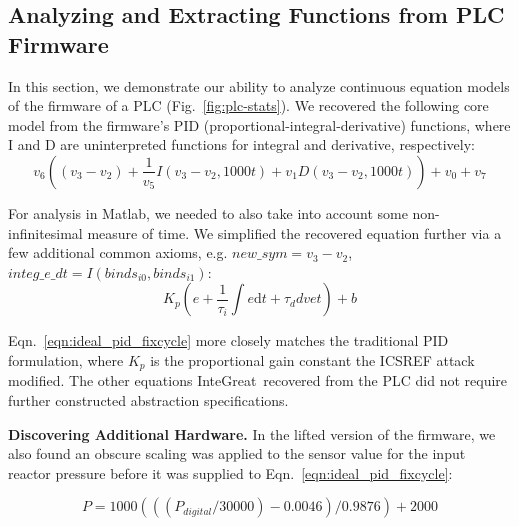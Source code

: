 \subsection{Analyzing and Extracting Functions from PLC Firmware}
\label{sec:plc}

In this section, we demonstrate our ability to analyze continuous equation models of the firmware of a PLC (Fig.~\ref{fig:plc-stats}).
We recovered the following core model from the firmware's PID (proportional-integral-derivative) functions, where I and D are uninterpreted functions for integral and derivative, respectively:
\begin{equation}
v_{6}(
(v_{3}-v_{2})+
\frac{1}{v_{5}}
I(v_{3}-v_{2},1000t)
+
v_{1}
D(v_{3}-v_{2},1000t)
)+v_{0}+v_{7}
    \label{eqn:ideal_pid_fixcycle}
\end{equation}

For analysis in Matlab, we needed to also take into account some non-infinitesimal measure of time.
We simplified the recovered equation further via a few additional common axioms, e.g. $new\_sym = v_{3} - v_{2}$, $integ\_e\_dt = I(binds_{i0}, binds_{i1})$:
\begin{equation}
    K_{p}(
        e + 
        \frac{1}{\tau_{i}}
        \int e \mathrm{d}t
        + 
        \tau_{d}
        dv e t
    ) + b
    \label{eqn:ideal_pid_fixcycle}
\end{equation}

Eqn.~\ref{eqn:ideal_pid_fixcycle} more closely matches the traditional PID formulation, where $K_{p}$ is the proportional gain constant the ICSREF attack modified.
The other equations InteGreat\ recovered from the PLC did not require further constructed abstraction specifications.

\textbf{Discovering Additional Hardware.}
In the lifted version of the firmware, we also found an obscure scaling was applied to the sensor value for the input reactor pressure before it was supplied to Eqn.~\ref{eqn:ideal_pid_fixcycle}:

\begin{equation}
    P = 1000(((P_{digital} / 30000) - 0.0046) / 0.9876) + 2000
	\label{eqn:input-conv}
\end{equation}

